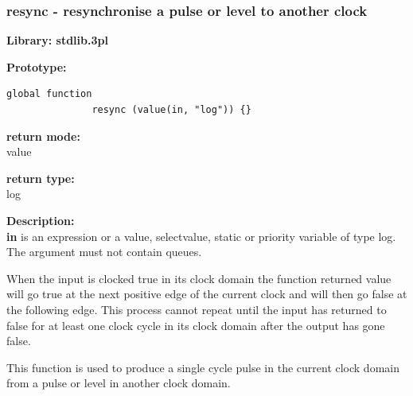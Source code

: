         \subsubsection{resync - resynchronise a pulse or level to another clock}\label{sec:lfresync}

            {\bf Library: stdlib.3pl}

            {\bf Prototype:} \\
            \vsp
            \begin{lstlisting}[gobble=12, language=threepl]
               global function
               resync (value(in, "log")) {}
            \end{lstlisting}

            {\bf return mode:} \\
            value

            {\bf return type:} \\
            log

            {\bf Description:} \\
            {\bf in} is an expression or a value, selectvalue, static or
            priority variable of type log. The argument must not contain queues.
        
            When the input is clocked true in its clock domain the function
            returned value will go true at the next positive edge of the
            current clock and will then go false at the following edge. This
            process cannot repeat until the input has returned to false for at
            least one clock cycle in its clock domain after the output has
            gone false.
            
            This function is used to produce a single cycle pulse in the
            current clock domain from a pulse or level in another clock
            domain.
            


